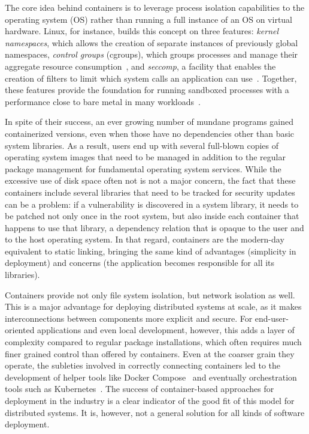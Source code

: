 \documentclass[sigplan, anonymous, 10pt]{acmart}
\begin{document}
The core idea behind containers is to leverage process isolation capabilities to the operating
system (OS) rather than running a full instance of an OS on virtual hardware. Linux, for instance,
builds this concept on three features:
\emph{kernel namespaces}, which allows the creation of separate instances of previously global
namespaces,
\emph{control groups} (cgroups), which groups processes and manage their aggregate resource
consumption~\cite{brown2014:cgroups}, and
\emph{seccomp}, a facility that enables the creation of filters to limit which system calls
an application can use~\cite{lwn2015:seccomp}. Together, these features provide the foundation
for running sandboxed processes with a performance close to bare metal in many
workloads~\cite{felter2015:comparison}.

In spite of their success, an ever growing number of mundane programs gained containerized versions,
even when those have no dependencies other than basic system libraries. As a result, users end up
with several full-blown copies of operating system images that need to be managed in addition to
the regular package management for fundamental operating system services. While the excessive use
of disk space often not is not a major concern, the fact that these containers include several
libraries that need to be tracked for security updates can be a problem: if a vulnerability is
discovered in a system library, it needs to be patched not only once in the root system, but
also inside each container that happens to use that library, a dependency relation that is
opaque to the user and to the host operating system. In that regard, containers are the modern-day
equivalent to static linking, bringing the same kind of advantages (simplicity in deployment)
and concerns (the application becomes responsible for all its libraries).

Containers provide not only file system isolation, but network isolation as
well. This is a major advantage for deploying distributed systems at scale, as
it makes interconnections between components more explicit and secure. For
end-user-oriented applications and even local development, however, this adds
a layer of complexity compared to regular package installations, which often
requires much finer grained control than offered by containers. Even at the
coarser grain they operate, the subleties involved in correctly connecting
containers led to the development of helper tools like Docker
Compose~\cite{compose2018} and eventually orchestration tools such as
Kubernetes~\cite{brewer2015:kube}. The success of container-based approaches
for deployment in the industry is a clear indicator of the good fit of this
model for distributed systems. It is, however, not a general solution for all
kinds of software deployment.
\end{document}
